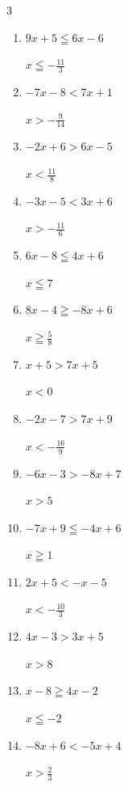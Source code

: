 \begin{multicols}{3}
\begin{enumerate}
        $\displaystyle x\geqq \frac{7}{8}$

  \item $9x+5\leqq 6x-6$

        $\displaystyle x\leqq -\frac{11}{3}$

  \item $-7x-8<7x+1$

        $\displaystyle x>-\frac{9}{14}$

\columnbreak %

  \item $-2x+6>6x-5$

        $\displaystyle x<\frac{11}{8}$

  \item $-3x-5<3x+6$

        $\displaystyle x>-\frac{11}{6}$

  \item $6x-8\leqq 4x+6$

        $\displaystyle x\leqq 7$

  \item $8x-4\geqq -8x+6$

        $\displaystyle x\geqq \frac{5}{8}$

  \item $x+5>7x+5$

        $\displaystyle x<0$

  \item $-2x-7>7x+9$

        $\displaystyle x<-\frac{16}{9}$

  \item $-6x-3>-8x+7$

        $\displaystyle x>5$

  \item $-7x+9\leqq -4x+6$

        $\displaystyle x\geqq 1$

  \item $2x+5<-x-5$

        $\displaystyle x<-\frac{10}{3}$

  \item $4x-3>3x+5$

        $\displaystyle x>8$

  \item $x-8\geqq 4x-2$

        $\displaystyle x\leqq -2$

  \item $-8x+6<-5x+4$

        $\displaystyle x>\frac{2}{3}$


\end{enumerate}
\end{multicols}
